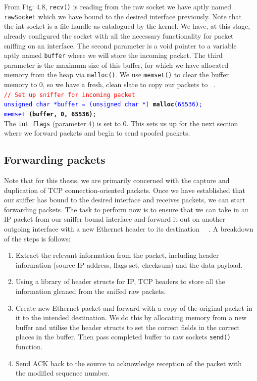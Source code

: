 From Fig: 4.8, {\tt recv()} is reading from the raw socket we have aptly named {\tt rawSocket} which we have bound to the desired interface previously. Note that the int socket is a file handle as catalogued by the kernel. We have, at this stage, already configured the socket with all the necessary functionality for packet sniffing on an interface. The second parameter is a void pointer to a variable aptly named {\tt buffer} where we will store the incoming packet. The third parameter is the maximum size of this buffer, for which we have allocated memory from the heap via {\tt malloc()}. We use {\tt memset()} to clear the buffer memory to 0, so we have a fresh, clean slate to copy our packets to ~\cite{39}. \\


{\tt \textcolor{red}{// Set up sniffer for incoming packet}\\     
   \textcolor{blue}{unsigned char *buffer = (unsigned char *)} \textbf{malloc}\textcolor{blue}{(65536);} \\
   \textcolor{blue}{memset} \textbf{(buffer, 0, 65536)};} \\
   
The {\tt int flags} (parameter 4) is set to 0.  This sets us up for the next section where we forward packets and begin to send spoofed packets. 

\subsection{Forwarding packets}
Note that for this thesis, we are primarily concerned with the capture and duplication of TCP connection-oriented packets. Once we have established that our sniffer has bound to the desired interface and receives packets, we can start forwarding packets. The task to perform now is to ensure that we can take in an IP packet from our sniffer bound interface and forward it out on another outgoing interface with a new Ethernet header to its destination ~\cite{35}~\cite{38}. A breakdown of the steps is follows:\\

\begin{enumerate}
\item Extract the relevant information from the packet, including header information (source IP address, flags set, checksum) and the data payload. \\
\item Using a library of header structs for IP, TCP  headers to store all the information gleaned from the sniffed raw packets. \\
\item Create new Ethernet packet and forward with a copy of the original packet in it to the intended destination. We do this by allocating memory from a new buffer and utilise the header structs to set the correct fields in the correct places in the buffer. Then pass completed buffer to raw sockets {\tt send()} function.\\
\item Send ACK back to the source to acknowledge reception of the packet with the modified sequence number. \\
\end{enumerate}

